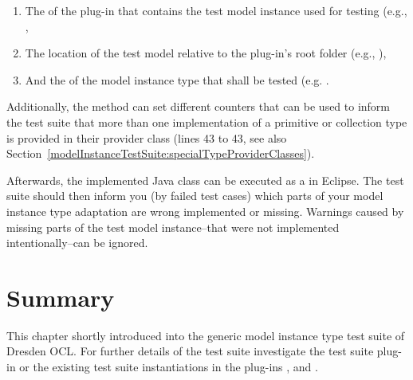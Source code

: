 \begin{enumerate}
	\item The  of the plug-in that contains the test model instance used 
	  for testing (e.g.,
	  ,
	\item The location of the test model relative to the plug-in's root folder 
	  (e.g.,
	  ),
	\item And the  of the model instance type that shall be tested (e.g.
	  .
\end{enumerate}

Additionally, the method can set different counters that can be used to inform
the test suite that more than one implementation of a primitive or collection
type is provided in their provider class (lines 43 to 43, see also 
Section~\ref{modelInstanceTestSuite:specialTypeProviderClasses}).

Afterwards, the implemented Java class can be executed as a  in Eclipse. The test suite should then inform you (by failed test 
cases) which parts of your model instance type adaptation are wrong implemented
or missing. Warnings caused by missing parts of the test model instance--that 
were not implemented intentionally--can be ignored.


\section{Summary}

This chapter shortly introduced into the generic model instance type test suite
of Dresden OCL. For further details of the test suite investigate the test suite
plug-in
or the existing test suite instantiations in the plug-ins
,
and .
